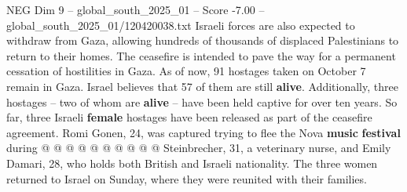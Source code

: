 \begin{textsample}{NEG Dim 9 – global\_south\_2025\_01 – Score -7.00 – global\_south\_2025\_01/120420038.txt}
Israeli forces are also expected to withdraw from Gaza, allowing hundreds of thousands of displaced Palestinians to return to their homes.
The ceasefire is intended to pave the way for a permanent cessation of hostilities in Gaza.
As of now, 91 hostages taken on October 7 remain in Gaza.
Israel believes that 57 of them are still \textbf{alive}.
Additionally, three hostages -- two of whom are \textbf{alive} -- have been held captive for over ten years.
So far, three Israeli \textbf{female} hostages have been released as part of the ceasefire agreement.
Romi Gonen, 24, was captured trying to flee the Nova \textbf{music} \textbf{festival} during @ @ @ @ @ @ @ @ @ @ Steinbrecher, 31, a veterinary nurse, and Emily Damari, 28, who holds both British and Israeli nationality.
The three women returned to Israel on Sunday, where they were reunited with their families.

\end{textsample}
